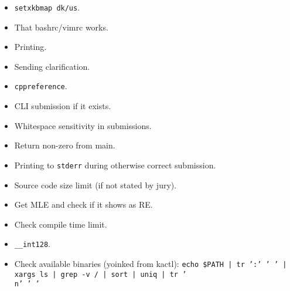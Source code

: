\begin{itemize}
	\item \texttt{setxkbmap dk/us}.

	\item That bashrc/vimrc works.

	\item Printing.

	\item Sending clarification.

	\item \texttt{cppreference}.

	\item CLI submission if it exists.

	\item Whitespace sensitivity in submissions.

	\item Return non-zero from main.

	\item Printing to \texttt{stderr} during otherwise correct submission.

	\item Source code size limit (if not stated by jury).

	\item Get MLE and check if it shows as RE.

	\item Check compile time limit.

	\item \texttt{\_\_int128}.

	\item Check available binaries (yoinked from kactl): \texttt{echo \$PATH | tr ':' ' ' | xargs ls | grep -v / | sort | uniq | tr '\\n' ' '}
\end{itemize}
